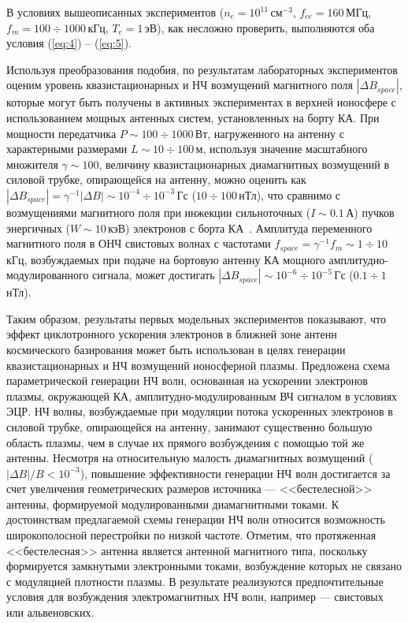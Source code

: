 \documentclass[10pt]{disser}
\begin{document}
В условиях вышеописанных экспериментов ($n_{e}=10^{11}$\,см$^{-3}$, $f_{ce}=160$\,МГц, $f_{m}=100\div1000$\,кГц, $T_e=1$\,эВ), как несложно проверить, выполняются оба условия (\ref{eq:4}) -- (\ref{eq:5}).

Используя преобразования подобия, по результатам лабораторных экспериментов оценим уровень квазистационарных и НЧ возмущений магнитного поля $|\Delta B_{space}|$, которые могут быть получены в активных экспериментах в верхней ионосфере с использованием мощных антенных систем, установленных на борту КА. При мощности передатчика $P\sim100\div1000$\,Вт, нагруженного на антенну с характерными размерами $L\sim10\div100$\,м, используя значение масштабного множителя $\gamma\sim 100$, величину квазистационарных диамагнитных возмущений в силовой трубке, опирающейся на антенну, можно оценить как $|\Delta{}B_{space}|=\gamma{}^{-1}|\Delta{}B|\sim 10^{-4}\div 10^{-3}$\,Гс ($10\div100$\,нТл), что сравнимо с возмущениями магнитного поля при инжекции сильноточных ($I\sim 0.1$\,А) пучков энергичных ($W\sim 10$\,кэВ) электронов с борта КА~\cite{Orajevskiy}. Амплитуда переменного магнитного поля в ОНЧ свистовых волнах с частотами $f_{space}=\gamma{}^{-1} f_m\sim 1\div 10$\,кГц, возбуждаемых при подаче на бортовую антенну КА мощного амплитудно-модулированного сигнала, может достигать $|\Delta{}B_{space}|\sim 10^{-6}\div 10^{-5}$\,Гс ($0.1\div 1$\,нТл).  

Таким образом, результаты первых модельных экспериментов показывают, что эффект циклотронного ускорения электронов в ближней зоне антенн космического базирования может быть использован в целях генерации квазистационарных и НЧ возмущений ионосферной плазмы. Предложена схема параметрической генерации НЧ волн, основанная на ускорении электронов плазмы, окружающей КА, амплитудно-мо\-ду\-ли\-ро\-ван\-ным ВЧ сигналом в условиях ЭЦР. НЧ волны, возбуждаемые при модуляции потока ускоренных электронов в силовой трубке, опирающейся на антенну, занимают существенно большую область плазмы, чем в случае их прямого возбуждения с помощью той же антенны. Несмотря на относительную малость диамагнитных возмущений ($|\Delta{}B|/B < 10^{-3}$), повышение эффективности генерации НЧ волн достигается за счет увеличения геометрических размеров источника --- <<бестелесной>> антенны, формируемой модулированными диамагнитными токами. К достоинствам предлагаемой схемы генерации НЧ волн относится возможность широкополосной перестройки по низкой частоте. Отметим, что протяженная <<бестелесная>> антенна является антенной магнитного типа, поскольку формируется замкнутыми электронными токами, возбуждение которых не связано с модуляцией плотности плазмы. В результате реализуются предпочтительные условия для возбуждения электромагнитных НЧ волн, например --- свистовых или альвеновских.
\end{document}
